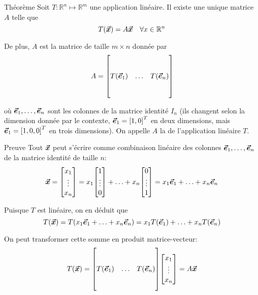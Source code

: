 \documentclass{article}
\begin{document}
\begin{parag}{Théorème}
    Soit $T: \mathbb{R}^{n} \mapsto \mathbb{R}^{m}$ une application linéaire. Il existe une unique matrice $A$ telle que
    \[T\left(\bvec{x}\right) = A \bvec{x} \mathspace \forall x \in \mathbb{R}^{n}\]

    De plus, $A$ est la matrice de taille $m\times n $ donnée par
    \[A = \begin{bmatrix}  &  &  \\  &  &  \\ T\left(\bvec{e}_1\right) & \ldots & T\left(\bvec{e}_n\right) \\  &  &  \\  &  &  \end{bmatrix} \]

    où $\bm{\protect\vec{e}}_1, \ldots, \bm{\protect\vec{e}}_n$ sont les colonnes de la matrice identité $I_n$ (ils changent selon la dimension donnée par le contexte, $\bvec{e}_1 = \left[1, 0\right]^T$ en deux dimensions, mais $\bvec{e}_1 = \left[1, 0, 0\right]^T$ en trois dimensions).  On appelle $A$ la  de l'application linéaire $T$.

    \begin{subparag}{Preuve}
        Tout $\bm{\protect\vec{x}}$ peut s'écrire comme combinaison linéaire des colonnes $\bm{\protect\vec{e}}_1, \ldots, \bm{\protect\vec{e}}_n$ de la matrice identité de taille $n$:
        \[\bvec{x} = \begin{bmatrix} x_1 \\ \vdots \\ x_n \end{bmatrix} = x_1 \begin{bmatrix} 1 \\ \vdots \\ 0 \end{bmatrix} + \ldots + x_n \begin{bmatrix} 0 \\ \vdots \\ 1 \end{bmatrix} = x_1 \bvec{e}_1 + \ldots + x_n \bvec{e}_n\]

        Puisque $T$ est linéaire, on en déduit que
    \[T\left(\bvec{x}\right) = T\left(x_1 \bvec{e}_1 + \ldots + x_n \bvec{e}_n\right) = x_1 T\left(\bvec{e}_1\right) + \ldots + x_n T\left(\bvec{e}_n\right)\]

        On peut transformer cette somme en produit matrice-vecteur:
        \[T\left(\bvec{x}\right) = \begin{bmatrix} & & \\ &  &  \\ T\left(\bvec{e}_1\right) & \ldots & T\left(\bvec{e}_n\right) \\  &  & \\ & & \end{bmatrix} \begin{bmatrix} x_1 \\ \vdots \\ x_n \end{bmatrix} = A \bvec{x}\]


\end{subparag}
\end{parag}
\end{document}
